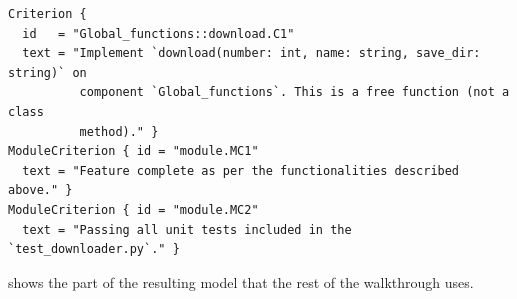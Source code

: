 \documentclass[10pt,a4paper]{article}
\newcommand{\cls}[1]{\textsf{#1}}
\newcommand{\code}[1]{\texttt{#1}}
\theoremstyle{definition}
\begin{document}
\begin{lstlisting}[style=model, caption={The seeded \cls{Criterion} for \code{download} (verbatim), and the module-level criteria held once.}, label={lst:crit}]
Criterion {
  id   = "Global_functions::download.C1"
  text = "Implement `download(number: int, name: string, save_dir: string)` on
          component `Global_functions`. This is a free function (not a class
          method)." }
ModuleCriterion { id = "module.MC1"
  text = "Feature complete as per the functionalities described above." }
ModuleCriterion { id = "module.MC2"
  text = "Passing all unit tests included in the `test_downloader.py`." }
\end{lstlisting}

 shows the part of the resulting model that the rest of the
walkthrough uses.
\end{document}
